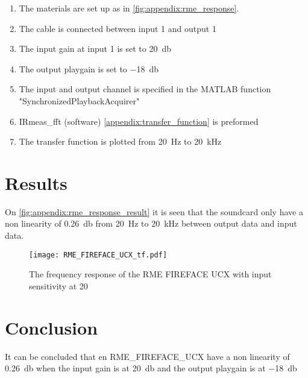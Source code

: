 \begin{enumerate}
\item The materials are set up as in \autoref{fig:appendix:rme_response}.
\item The cable is connected between input 1 and output 1
\item The input gain at input 1 is set to \SI{20}{\decibel}
\item The output playgain is set to \SI{-18}{\decibel}
\item The input and output channel is specified in the MATLAB function "SynchronizedPlaybackAcquirer" 
\item IRmeas_fft (software) \autoref{appendix:transfer_function} is preformed
\item The transfer function is plotted from \SI{20}{\hertz} to \SI{20}{\kilo\hertz}
\end{enumerate}

\section*{Results}



On \autoref{fig:appendix:rme_response_result} it is seen that the soundcard only have a non linearity of \SI{0.26}{\decibel} from \SI{20}{\hertz} to \SI{20}{\kilo\hertz} between output data and input data. 

\begin{figure}[H]
	\centering
	\texttt{[image: RME\_FIREFACE\_UCX\_tf.pdf]}
	\caption{The frequency response of the RME FIREFACE UCX with input sensitivity at 20}
		\label{fig:appendix:rme_response_result}
\end{figure}

\section*{Conclusion}
It can be concluded that en RME_FIREFACE_UCX have a non linearity of \SI{0.26}{\decibel} when the input gain is at \SI{20}{\decibel} and the output playgain is at \SI{-18}{\decibel}


